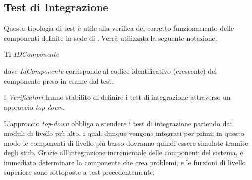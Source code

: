 \newpage
\subsection{Test di Integrazione}
Questa tipologia di test è utile alla verifica del corretto funzionamento delle componenti definite in sede di \SpecificaTecnica.
Verrà utilizzata la seguente notazione:
	\begin{center}
		TI-\textit{IDComponente}
	\end{center}
dove \textit{IdComponente} corrisponde al codice identificativo (crescente) del componente preso in esame
dal test.

I \textit{Verificatori} hanno stabilito di definire i test di integrazione attraverso un approccio  \textit{top-down}. 


L'approccio \textit{top-down} obbliga a stendere i test di integrazione partendo dai moduli
di livello più alto, i quali dunque vengono integrati per primi;
in questo modo le componenti di livello più basso dovranno quindi essere simulate tramite degli
stub. Grazie all'integrazione incrementale delle componenti del sistema, è immediato determinare
la componente che crea problemi, e le funzioni di livello superiore sono sottoposte a test precedentemente.







